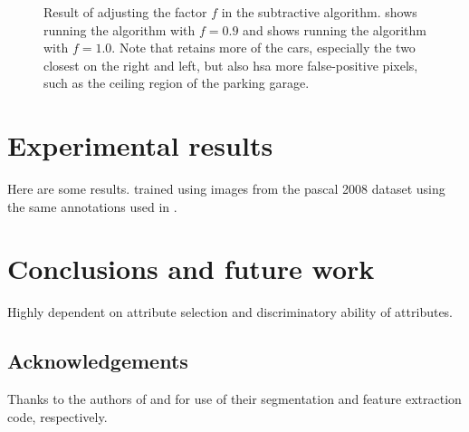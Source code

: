 \documentclass[10pt,twocolumn,letterpaper]{article}
\begin{document}
\begin{figure}
\centering
{}
\caption{Result of adjusting the factor $f$ in the subtractive algorithm.
 shows running the algorithm with $f=0.9$ and 
shows running the algorithm with $f=1.0$.  Note that  retains
more of the cars, especially the two closest on the right and left, but also
hsa more false-positive pixels, such as the ceiling region of the parking
garage.}
\label{fig:f}
\end{figure}

\section{Experimental results}
\label{sec:results}
Here are some results.
 trained using images from the pascal 
2008 dataset using the same annotations used in \cite{farhadi09}.

\section{Conclusions and future work}
\label{sec:conclusions}
Highly dependent on attribute selection and discriminatory ability of attributes.

\subsection*{Acknowledgements}
Thanks to the authors of \cite{arbelaez09} and \cite{farhadi09} for use of their
segmentation and feature extraction code, respectively.

{\small
%


}
\end{document}
